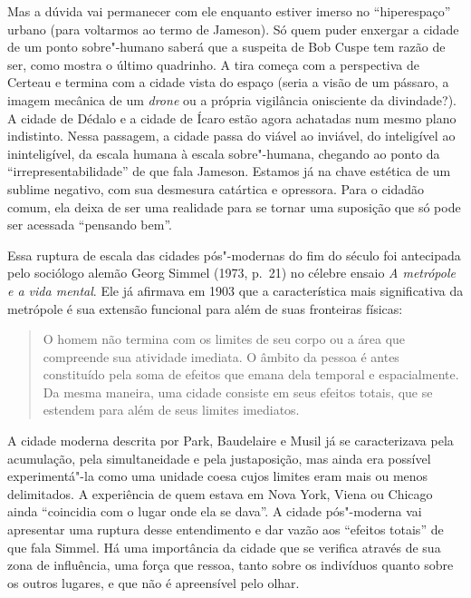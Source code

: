 Mas a dúvida vai permanecer com ele enquanto estiver imerso no
``hiperespaço'' urbano (para voltarmos ao termo de Jameson). Só quem
puder enxergar a cidade de um ponto sobre"-humano saberá que a suspeita
de Bob Cuspe tem razão de ser, como mostra o último quadrinho. A tira
começa com a perspectiva de Certeau e termina com a cidade vista do
espaço (seria a visão de um pássaro, a imagem mecânica de um
\emph{drone} ou a própria vigilância onisciente da divindade?). A cidade
de Dédalo e a cidade de Ícaro estão agora achatadas num mesmo plano
indistinto. Nessa passagem, a cidade passa do viável ao inviável, do
inteligível ao ininteligível, da escala humana à escala sobre"-humana,
chegando ao ponto da ``irrepresentabilidade'' de que fala Jameson.
Estamos já na chave estética de um sublime negativo, com sua desmesura
catártica e opressora. Para o cidadão comum, ela deixa de ser uma
realidade para se tornar uma suposição que só pode ser acessada
``pensando bem''.

Essa ruptura de escala das cidades pós"-modernas do fim do século  foi
antecipada pelo sociólogo alemão Georg Simmel (1973, p.~21) no célebre ensaio \emph{A
metrópole e a vida mental}. Ele já afirmava em 1903 que a característica
mais significativa da metrópole é sua extensão funcional para além de
suas fronteiras físicas:

\begin{quote}
O homem não termina com os limites de seu corpo ou a área que compreende
sua atividade imediata. O âmbito da pessoa é antes constituído pela soma
de efeitos que emana dela temporal e espacialmente. Da mesma maneira,
uma cidade consiste em seus efeitos totais, que se estendem para além de
seus limites imediatos.
\end{quote}

A cidade moderna descrita por Park, Baudelaire e Musil já se
caracterizava pela acumulação, pela simultaneidade e pela justaposição,
mas ainda era possível experimentá"-la como uma unidade coesa cujos
limites eram mais ou menos delimitados. A experiência de quem estava em
Nova York, Viena ou Chicago ainda ``coincidia com o lugar onde ela se
dava''. A cidade pós"-moderna vai apresentar uma ruptura desse
entendimento e dar vazão aos ``efeitos totais'' de que fala Simmel. Há
uma importância da cidade que se verifica através de sua zona de
influência, uma força que ressoa, tanto sobre os indivíduos quanto sobre
os outros lugares, e que não é apreensível pelo olhar.

